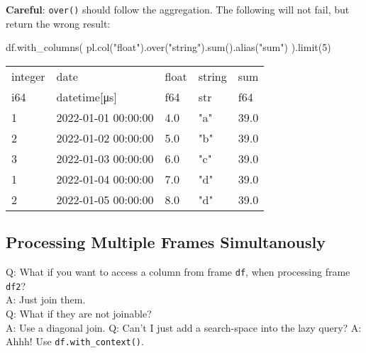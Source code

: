 \documentclass[
  letterpaper,
  DIV=11,
  numbers=noendperiod]{scrartcl}
\newenvironment{Shaded}{\begin{snugshade}}{\end{snugshade}}
\newcommand{\BuiltInTok}[1]{\textcolor[rgb]{0.00,0.23,0.31}{#1}}
\newcommand{\DecValTok}[1]{\textcolor[rgb]{0.68,0.00,0.00}{#1}}
\newcommand{\NormalTok}[1]{\textcolor[rgb]{0.00,0.23,0.31}{#1}}
\newcommand{\StringTok}[1]{\textcolor[rgb]{0.13,0.47,0.30}{#1}}
\begin{document}
\textbf{Careful}: \texttt{over()} should follow the aggregation. The
following will not fail, but return the wrong result:

\begin{Shaded}
\begin{Highlighting}[]
\NormalTok{df.with\_columns(}
\NormalTok{  pl.col(}\StringTok{"float"}\NormalTok{).over(}\StringTok{"string"}\NormalTok{).}\BuiltInTok{sum}\NormalTok{().alias(}\StringTok{"sum"}\NormalTok{)}
\NormalTok{).limit(}\DecValTok{5}\NormalTok{)}
\end{Highlighting}
\end{Shaded}

\begin{longtable}[]{@{}lllll@{}}
\toprule()
integer & date & float & string & sum \\
i64 & datetime{[}μs{]} & f64 & str & f64 \\
\midrule()
\endhead
1 & 2022-01-01 00:00:00 & 4.0 & "a" & 39.0 \\
2 & 2022-01-02 00:00:00 & 5.0 & "b" & 39.0 \\
3 & 2022-01-03 00:00:00 & 6.0 & "c" & 39.0 \\
1 & 2022-01-04 00:00:00 & 7.0 & "d" & 39.0 \\
2 & 2022-01-05 00:00:00 & 8.0 & "d" & 39.0 \\
\bottomrule()
\end{longtable}

\hypertarget{processing-multiple-frames-simultanously}{%
\subsection{Processing Multiple Frames
Simultanously}\label{processing-multiple-frames-simultanously}}

Q: What if you want to access a column from frame \texttt{df}, when
processing frame \texttt{df2}?\\
A: Just join them.\\
Q: What if they are not joinable?\\
A: Use a diagonal join. Q: Can't I just add a search-space into the lazy
query? A: Ahhh! Use \texttt{df.with\_context()}.
\end{document}
